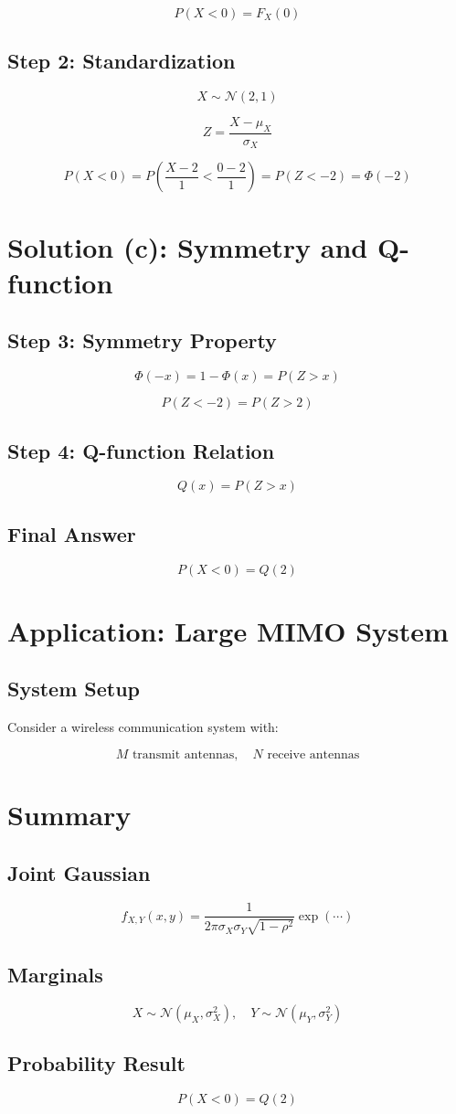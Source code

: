 \documentclass[11pt]{article}
\begin{document}
\[
P(X < 0) = F_X(0)
\]

\subsection{Step 2: Standardization}

\[
X \sim \mathcal{N}(2,1)
\]

\[
Z = \frac{X - \mu_X}{\sigma_X}
\]

\[
P(X < 0)
=
P\left(\frac{X-2}{1} < \frac{0-2}{1}\right)
=
P(Z < -2)
=
\Phi(-2)
\]

\section{Solution (c): Symmetry and Q-function}

\subsection{Step 3: Symmetry Property}

\[
\Phi(-x) = 1 - \Phi(x) = P(Z > x)
\]

\[
P(Z < -2) = P(Z > 2)
\]

\subsection{Step 4: Q-function Relation}

\[
Q(x) = P(Z > x)
\]

\subsection{Final Answer}

\[
P(X < 0) = Q(2)
\]

\section{Application: Large MIMO System}

\subsection{System Setup}

Consider a wireless communication system with:

\[
M \text{ transmit antennas}, \quad N \text{ receive antennas}
\]

\section{Summary}

\subsection{Joint Gaussian}

\[
f_{X,Y}(x,y)
=
\frac{1}{2\pi \sigma_X \sigma_Y \sqrt{1-\rho^2}}
\exp(\cdots)
\]

\subsection{Marginals}

\[
X \sim \mathcal{N}(\mu_X, \sigma_X^2), \quad
Y \sim \mathcal{N}(\mu_Y, \sigma_Y^2)
\]

\subsection{Probability Result}

\[
P(X < 0) = Q(2)
\]
\end{document}

